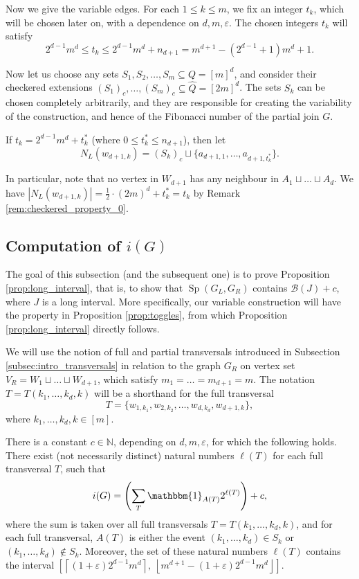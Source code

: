 \documentclass[10pt,a4paper]{article}
\numberwithin{equation}{section}
\newcommand{\nn}{\mathbb{N}}
\newcommand{\eps}{\varepsilon}
\newcommand{\cB}{\mathcal{B}}
\DeclareMathOperator{\Sp}{Sp}
\begin{document}
\noindent Now we give the variable edges. For each $1\le k\le m$, we fix an integer $t_k$, which will be chosen later on, with a dependence on $d,m,\eps$. The chosen integers $t_k$ will satisfy
$$2^{d-1}m^d\le t_k\le 2^{d-1}m^d+n_{d+1}=m^{d+1}-(2^{d-1}+1)m^d+1.$$

Now let us choose any sets $S_1, S_2, \ldots, S_m\subseteq Q=[m]^d$, and consider their checkered extensions $(S_1)_c, \ldots, (S_m)_c\subseteq \widehat{Q}=[2m]^d$. The sets $S_k$ can be chosen completely arbitrarily, and they are responsible for creating the variability of the construction, and hence of the Fibonacci number of the partial join $G$.

If $t_k=2^{d-1}m^d+t_k^{*}$ (where $0\le t_k^{*}\le n_{d+1}$), then let
$$N_L(w_{d+1,k})=(S_k)_c \sqcup \{a_{d+1,1}, \ldots, a_{d+1,{t_k^{*}}}\}.$$

In particular, note that no vertex in $W_{d+1}$ has any neighbour in $A_1\sqcup \ldots\sqcup A_d$. We have $|N_L(w_{d+1,k})|=\frac12\cdot (2m)^d+t_k^{*}=t_k$ by Remark \ref{rem:checkered_property_0}.

\subsection{Computation of $i(G)$}\label{subsec:computation}

The goal of this subsection (and the subsequent one) is to prove Proposition \ref{prop:long_interval}, that is, to show that $\Sp(G_L, G_R)$ contains $\cB(J)+c$, where $J$ is a long interval. More specifically, our variable construction will have the property in Proposition \ref{prop:toggles}, from which Proposition \ref{prop:long_interval} directly follows.

We will use the notion of full and partial transversals introduced in Subsection \ref{subsec:intro_transversals} in relation to the graph $G_R$ on vertex set $V_R=W_1\sqcup \ldots \sqcup W_{d+1}$, which satisfy $m_1=\ldots=m_{d+1}=m$. The notation $T=T(k_1, \dots, k_d,k)$ will be a shorthand for the full transversal
$$T=\{w_{1,k_1}, w_{2,k_2}, \ldots, w_{d,k_d}, w_{d+1,k}\},$$ where $k_1,\ldots,k_d,k\in [m]$.

\begin{proposition}\label{prop:toggles}
There is a constant $c\in \nn$, depending on $d,m,\eps$, for which the following holds. There exist (not necessarily distinct) natural numbers $\ell(T)$ for each full transversal $T$, such that
$$i(G)=\left(\sum_T \mathbbm{1}_{A(T)} 2^{\ell(T)}\right)+c,$$
where the sum is taken over all full transversals $T=T(k_1,\ldots, k_d,k)$, and for each full transversal, $A(T)$ is either the event $(k_1, \ldots, k_d)\in S_k$ or $(k_1, \ldots, k_d)\not\in S_k$. Moreover, the set of these natural numbers $\ell(T)$ contains the interval $\left[\left\lceil(1+\eps)2^{d-1}m^d\right\rceil,~ \left\lfloor m^{d+1}-(1+\eps)2^{d-1}m^d\right\rfloor\right]$.
\end{proposition}
\end{document}
